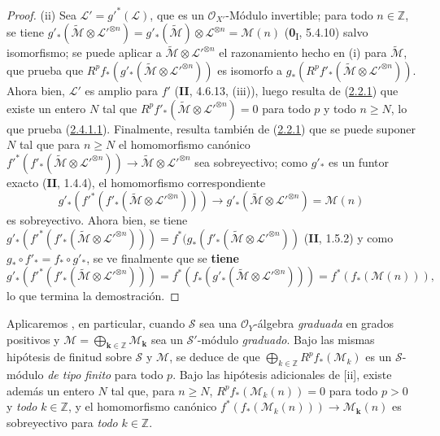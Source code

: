 \begin{proof}
(ii) Sea $\mathcal L'=g'^*(\mathcal L)$, que es un
$\mathcal O_{X'}$-Módulo invertible; para todo $n\in\mathbb Z$, se tiene
$g'_*(\widetilde{\mathcal M}\otimes\mathcal L'^{\otimes n})
=g'_*(\widetilde{\mathcal M})\otimes\mathcal L^{\otimes n}
=\mathcal M(n)$
(\textbf{0}\textsubscript{I}, 5.4.10) salvo isomorfismo; se puede aplicar
a $\widetilde{\mathcal M}\otimes\mathcal L'^{\otimes n}$ el
razonamiento hecho en (i) para $\widetilde{\mathcal M}$, que prueba que
$R^pf_*(g'_*(\widetilde{\mathcal M}\otimes\mathcal L'^{\otimes n}))$
es isomorfo a
$g_*(R^pf'_*(\widetilde{\mathcal M}\otimes\mathcal L'^{\otimes n}))$.
Ahora bien, $\mathcal L'$ es amplio para $f'$ (\textbf{II}, 4.6.13, (iii)), luego resulta
de (\hyperref[III.2.2.1-fr]{2.2.1}) que existe un entero $N$ tal que
$R^pf'_*(\widetilde{\mathcal M}\otimes\mathcal L'^{\otimes n})=0$
para todo $p$ y todo $n\geq N$, lo que prueba
(\hyperref[III.2.4.1.1-fr]{2.4.1.1}). Finalmente, resulta también de
(\hyperref[III.2.2.1-fr]{2.2.1}) que se puede suponer $N$ tal que para
$n\geq N$ el homomorfismo canónico
$f'^*(f'_*(\widetilde{\mathcal M}\otimes\mathcal L'^{\otimes n}))
\longrightarrow\widetilde{\mathcal M}\otimes\mathcal L'^{\otimes n}$
sea sobreyectivo; como $g'_*$ es un funtor exacto (\textbf{II}, 1.4.4),
el homomorfismo correspondiente
\[
g'_*(f'^*(f'_*(\widetilde{\mathcal M}\otimes
\mathcal L'^{\otimes n})))
\longrightarrow
g'_*(\widetilde{\mathcal M}\otimes\mathcal L'^{\otimes n})
=\mathcal M(n)
\]
es sobreyectivo. Ahora bien, se tiene
$g'_*(f'^*(f'_*(\widetilde{\mathcal M}\otimes
\mathcal L'^{\otimes n})))
=f^*(g_*(f'_*(\widetilde{\mathcal M}\otimes
\mathcal L'^{\otimes n}))$
(\textbf{II}, 1.5.2) y como $g_*\circ f'_* = f_*\circ g'_*$, se ve
finalmente que se \textbf{tiene}
\[
g'_*(f'^*(f'_*(\widetilde{\mathcal M}\otimes\mathcal L'^{\otimes n})))
=f^*(f_*(g'_*(\widetilde{\mathcal M}\otimes
\mathcal L'^{\otimes n})))=f^*(f_*(\mathcal M(n))),
\]
lo que termina la demostración.
\end{proof}

\begin{env}[2.4.2]
\label{III.2.4.2}
\label{III.2.4.2-fr}
Aplicaremos , en particular, cuando $\mathcal S$ sea una $\mathcal O_Y$-álgebra \emph{graduada} en grados positivos y
$\mathcal M=\bigoplus_{\boldsymbol{k}\in\mathbb Z}\mathcal M_{\boldsymbol{k}}$
sea un $\mathcal S'$-módulo \emph{graduado}.
Bajo las mismas hipótesis de finitud sobre $\mathcal S$ y $\mathcal M$, se deduce de  que
$\bigoplus_{k\in\mathbb Z}R^pf_*(\mathcal M_k)$
es un $\mathcal S$-módulo \emph{de tipo finito} para todo $p$.
Bajo las hipótesis adicionales de [ii], existe además un entero $N$ tal que, para $n\geq N$,
$R^pf_*(\mathcal M_k(n))=0$
para todo $p>0$ y \emph{todo} $k\in\mathbb Z$, y el homomorfismo canónico
$f^*(f_*(\mathcal M_k(n)))\to\mathcal M_{\boldsymbol{k}}(n)$
es sobreyectivo para \emph{todo} $k\in\mathbb Z$.
\end{env}


